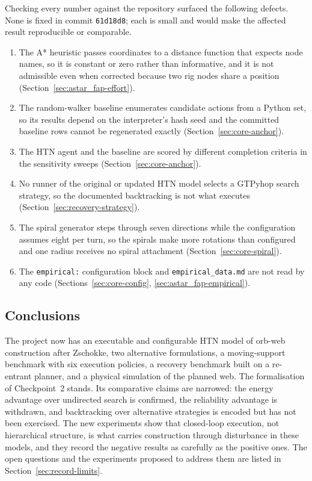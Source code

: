 Checking every number against the repository surfaced the following defects. None is fixed in commit
\texttt{61d18d8}; each is small and would make the affected result reproducible or comparable.

\begin{enumerate}
\item The A* heuristic passes coordinates to a distance function that expects node names, so it is constant
or zero rather than informative, and it is not admissible even when corrected because two rig nodes share a
position (Section~\ref{sec:astar_fap-effort}).
\item The random-walker baseline enumerates candidate actions from a Python set, so its results depend on
the interpreter's hash seed and the committed baseline rows cannot be regenerated exactly
(Section~\ref{sec:core-anchor}).
\item The HTN agent and the baseline are scored by different completion criteria in the sensitivity sweeps
(Section~\ref{sec:core-anchor}).
\item No runner of the original or updated HTN model selects a GTPyhop search strategy, so the documented
backtracking is not what executes (Section~\ref{sec:recovery-strategy}).
\item The spiral generator steps through seven directions while the configuration assumes eight per turn, so
the spirals make more rotations than configured and one radius receives no spiral attachment
(Section~\ref{sec:core-spiral}).
\item The \texttt{empirical:} configuration block and \texttt{empirical\_data.md} are not read by any code
(Sections~\ref{sec:core-config}, \ref{sec:astar_fap-empirical}).
\end{enumerate}

\subsection{Conclusions}
\label{sec:synthesis-conclusions}

The project now has an executable and configurable HTN model of orb-web construction after Zschokke, two
alternative formulations, a moving-support benchmark with six execution policies, a recovery benchmark built
on a re-entrant planner, and a physical simulation of the planned web. The formalisation of Checkpoint~2
stands. Its comparative claims are narrowed: the energy advantage over undirected search is confirmed, the
reliability advantage is withdrawn, and backtracking over alternative strategies is encoded but has not been
exercised. The new experiments show that closed-loop execution, not hierarchical structure, is what carries
construction through disturbance in these models, and they record the negative results as carefully as the
positive ones. The open questions and the experiments proposed to address them are listed in
Section~\ref{sec:record-limits}.
